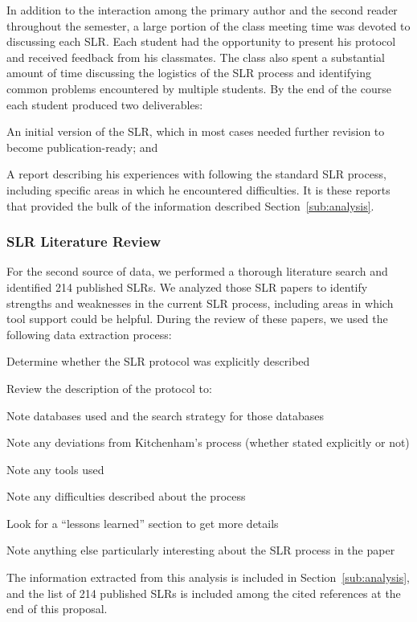 In addition to the interaction among the primary author and the second reader throughout the semester, a large portion of the class meeting time was devoted to discussing each SLR. Each student had the opportunity to present his protocol and received feedback from his classmates. The class also spent a substantial amount of time discussing the logistics of the SLR process and identifying common problems encountered by multiple students. By the end of the course each student produced two deliverables:
\vspace*{-4pt}
\begin{enumerate*}
\item An initial version of the SLR, which in most cases needed further revision to become publication-ready; and
\item A report describing his experiences with following the standard SLR process, including specific areas in which he encountered difficulties. It is these reports that provided the bulk of the information described Section~\ref{sub:analysis}.
\end{enumerate*}
\vspace*{-4pt}

\subsubsection{SLR Literature Review}
\label{sub:SLR:review}

For the second source of data, we performed a thorough literature search and identified 214 published SLRs. We analyzed those SLR papers to identify strengths and weaknesses in the current SLR process, including areas in which tool support could be helpful. During the review of these papers, we used the following data extraction process:
\vspace*{-4pt}
\begin{enumerate*}
\item Determine whether the SLR protocol was explicitly described
\item Review the description of the protocol to:
\vspace*{-4pt}
   \begin{enumerate*}
	\item Note databases used and the search strategy for those databases
	\item Note any deviations from Kitchenham's process (whether stated explicitly or not)
	\item Note any tools used
	\item Note any difficulties described about the process
   \end{enumerate*}
\vspace*{-4pt}
\item Look for a ``lessons learned'' section to get more details
\item Note anything else particularly interesting about the SLR process in the paper
\end{enumerate*}
\vspace*{-4pt}
The information extracted from this analysis is included in Section~\ref{sub:analysis},
and the list of 214 published SLRs is included among the cited references at the end of this proposal.

